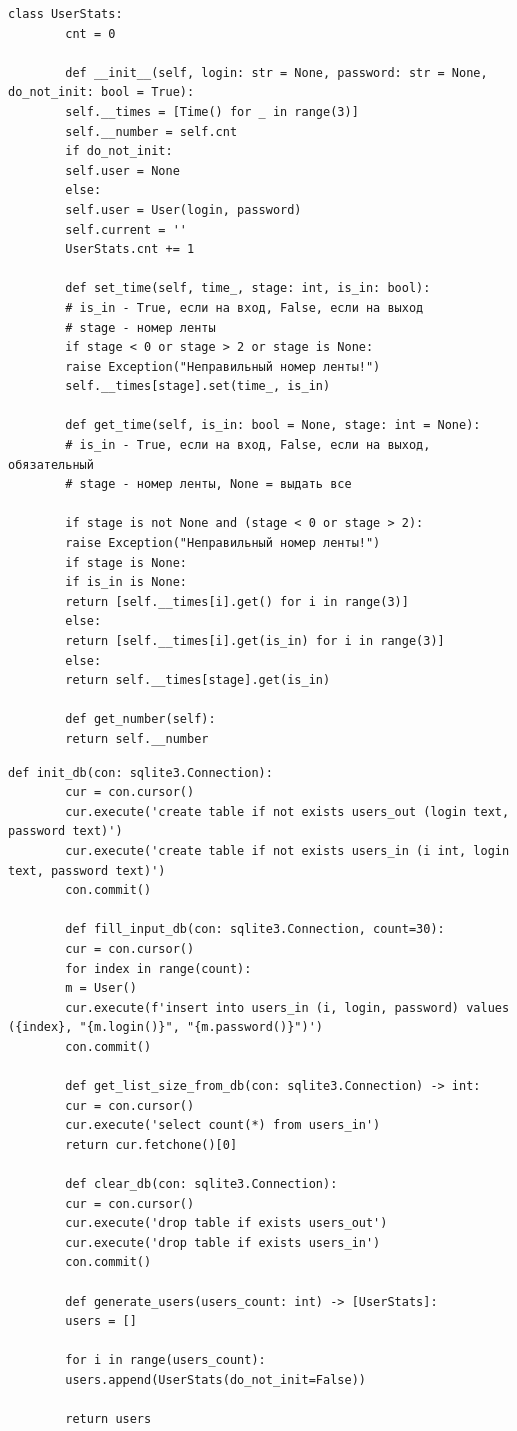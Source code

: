 \documentclass[12pt]{report}
\begin{document}
    \newpage
    \begin{lstlisting}[caption=Класс UserStats, label={lst:userStatsClass}]
    	class UserStats:
    	cnt = 0
    	
    	def __init__(self, login: str = None, password: str = None, 	do_not_init: bool = True):
    	self.__times = [Time() for _ in range(3)]
    	self.__number = self.cnt
    	if do_not_init:
    	self.user = None
    	else:
    	self.user = User(login, password)
    	self.current = ''
    	UserStats.cnt += 1
    	
    	def set_time(self, time_, stage: int, is_in: bool):
    	# is_in - True, если на вход, False, если на выход
    	# stage - номер ленты
    	if stage < 0 or stage > 2 or stage is None:
    	raise Exception("Неправильный номер ленты!")
    	self.__times[stage].set(time_, is_in)
    	
    	def get_time(self, is_in: bool = None, stage: int = None):
    	# is_in - True, если на вход, False, если на выход, обязательный
    	# stage - номер ленты, None = выдать все
    	
    	if stage is not None and (stage < 0 or stage > 2):
    	raise Exception("Неправильный номер ленты!")
    	if stage is None:
    	if is_in is None:
    	return [self.__times[i].get() for i in range(3)]
    	else:
    	return [self.__times[i].get(is_in) for i in range(3)]
    	else:
    	return self.__times[stage].get(is_in)
    	
    	def get_number(self):
    	return self.__number
    \end{lstlisting}
    \newpage
    \begin{lstlisting}[caption=Файл master.py (часть 1), label={lst:master1}]
    	def init_db(con: sqlite3.Connection):
    	cur = con.cursor()
    	cur.execute('create table if not exists users_out (login text, password text)')
    	cur.execute('create table if not exists users_in (i int, login text, password text)')
    	con.commit()
    	
    	def fill_input_db(con: sqlite3.Connection, count=30):
    	cur = con.cursor()
    	for index in range(count):
    	m = User()
    	cur.execute(f'insert into users_in (i, login, password) values ({index}, "{m.login()}", "{m.password()}")')
    	con.commit()
    	
    	def get_list_size_from_db(con: sqlite3.Connection) -> int:
    	cur = con.cursor()
    	cur.execute('select count(*) from users_in')
    	return cur.fetchone()[0]
    	
    	def clear_db(con: sqlite3.Connection):
    	cur = con.cursor()
    	cur.execute('drop table if exists users_out')
    	cur.execute('drop table if exists users_in')
    	con.commit()
    	
    	def generate_users(users_count: int) -> [UserStats]:
    	users = []
    	
    	for i in range(users_count):
    	users.append(UserStats(do_not_init=False))
    	
    	return users
    \end{lstlisting}
\end{document}
